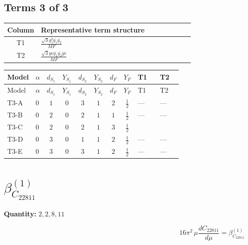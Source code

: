 \documentclass[8pt]{article}
\begin{document}
\begin{landscape}
\subsection*{Terms 3 of 3}
\begin{center}
\begin{tabular}{@{}c >{\raggedright\arraybackslash}p{0.82\linewidth}@{}}
\toprule
Column & Representative term structure \\
\midrule
T1 & \(\displaystyle \frac{\sqrt{3} g_{1}^{2} \overline{y_{1}} \overline{y_{2}}}{MF}\) \\
\midrule
T2 & \(\displaystyle \frac{\sqrt{3} ye \overline{y_{1}} \overline{y_{2}} \overline{ye}}{MF}\) \\
\midrule
\bottomrule
\end{tabular}
\end{center}
\smallskip
\tiny
\begin{longtable}{@{}llcccccc >{\raggedright\arraybackslash}p{0.21\linewidth} >{\raggedright\arraybackslash}p{0.21\linewidth}@{}}
\toprule
Model & $\alpha$ & $d_{S_1}$ & $Y_{S_1}$ & $d_{S_2}$ & $Y_{S_2}$ & $d_F$ & $Y_F$ & T1 & T2 \\
\midrule
\endfirsthead
\toprule
Model & $\alpha$ & $d_{S_1}$ & $Y_{S_1}$ & $d_{S_2}$ & $Y_{S_2}$ & $d_F$ & $Y_F$ & T1 & T2 \\
\midrule
\endhead
T3-A & $0$ & $1$ & $0$ & $3$ & $1$ & $2$ & $\frac{1}{2}$ & --- & --- \\
\midrule
T3-B & $0$ & $2$ & $0$ & $2$ & $1$ & $1$ & $\frac{1}{2}$ & --- & --- \\
\midrule
T3-C & $0$ & $2$ & $0$ & $2$ & $1$ & $3$ & $\frac{1}{2}$ & \scriptsize\adjustbox{max width=\linewidth}{$\begin{gathered} - \frac{\sqrt{3} g_{1}^{2} \overline{y_{1}} \overline{y_{2}}}{8 MF}\end{gathered}$} & \scriptsize\adjustbox{max width=\linewidth}{$\begin{gathered} \frac{\sqrt{3} ye \overline{y_{1}} \overline{y_{2}} \overline{ye}}{12 MF}\end{gathered}$} \\
\midrule
T3-D & $0$ & $3$ & $0$ & $1$ & $1$ & $2$ & $\frac{1}{2}$ & --- & --- \\
\midrule
T3-E & $0$ & $3$ & $0$ & $3$ & $1$ & $2$ & $\frac{1}{2}$ & --- & --- \\
\midrule
\bottomrule
\end{longtable}
\clearpage
\section*{$\beta_{C_{22811}}^{(1)}$}
\noindent\textbf{Quantity: }$\mathrm{2,2,8,11}$\par\smallskip
\[16\pi^2\,\mu\frac{d C_{22811}}{d\mu}=\beta_{C_{22811}}^{(1)}\]

\end{landscape}
\end{document}
